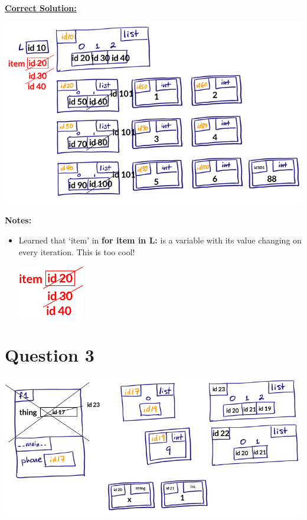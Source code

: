 \documentclass[12pt]{article}
\begin{document}
\begin{mdframed}
    \underline{\textbf{Correct Solution:}}

    \bigskip

    \begin{center}
    \includegraphics[width=0.8 \linewidth]{images/worksheet_1_review_q2_correction.png}
    \end{center}

\end{mdframed}

\bigskip

\textbf{Notes:}

\begin{itemize}
    \item Learned that `item' in \textbf{for item in L:} is a variable with its
    value changing on every iteration. This is too cool!

    \begin{center}
    \includegraphics[width=0.2\linewidth]{images/worksheet_1_review_q2_note.png}
    \end{center}
\end{itemize}

\section*{Question 3}
\begin{center}
\includegraphics[width=0.8\linewidth]{images/worksheet_1_review_q3_solution.png}
\end{center}
\end{document}
